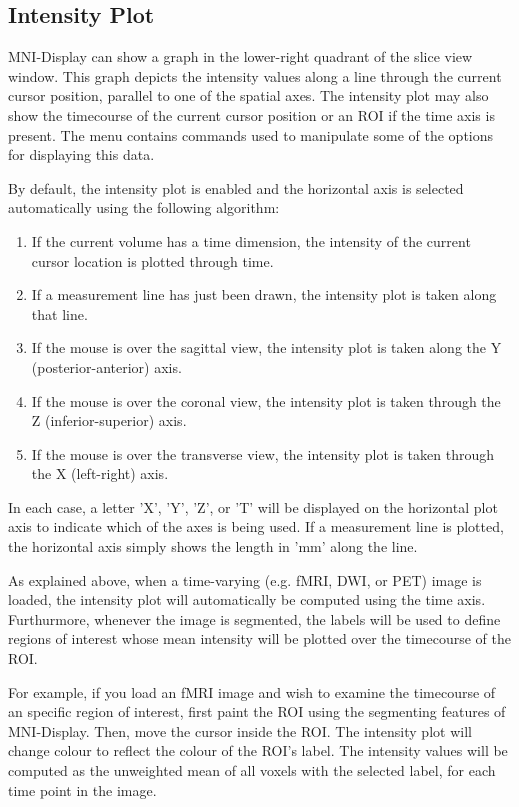 \documentclass[11pt,letterpaper]{article}
\newcommand{\display}{\mbox{MNI-Display}}
\newcommand{\menu}[1]{{\scriptsize \fbox{\bf #1}}}
\begin{document}
\subsection{Intensity Plot}
\label{secIntensity}

\display{} can show a graph in the lower-right quadrant of the slice
view window. This graph depicts the intensity values along a line
through the current cursor position, parallel to one of the spatial
axes. The intensity plot may also show the timecourse of the current
cursor position or an ROI if the time axis is present.  The
\menu{Intensity Plot} menu contains commands used to manipulate some
of the options for displaying this data.

By default, the intensity plot is enabled and the horizontal axis is
selected automatically using the following algorithm:

\begin{enumerate}
\item If the current volume has a time dimension, the intensity of the
  current cursor location is plotted through time.
\item If a measurement line has just been drawn, the intensity plot is taken along that line.
\item If the mouse is over the sagittal view, the intensity plot is taken along the Y (posterior-anterior) axis.
\item If the mouse is over the coronal view, the intensity plot is taken through the Z (inferior-superior) axis.
\item If the mouse is over the transverse view, the intensity plot is taken through the X (left-right) axis.
\end{enumerate}

In each case, a letter 'X', 'Y', 'Z', or 'T' will be displayed on the
horizontal plot axis to indicate which of the axes is being used. If a
measurement line is plotted, the horizontal axis simply shows the
length in 'mm' along the line.

As explained above, when a time-varying (e.g. fMRI, DWI, or PET) image
is loaded, the intensity plot will automatically be computed using the
time axis. Furthurmore, whenever the image is segmented, the labels
will be used to define regions of interest whose mean intensity will
be plotted over the timecourse of the ROI.

For example, if you load an fMRI image and wish to examine the
timecourse of an specific region of interest, first paint the ROI
using the segmenting features of \display{}. Then, move the cursor
inside the ROI. The intensity plot will change colour to reflect the
colour of the ROI's label. The intensity values will be computed as
the unweighted mean of all voxels with the selected label, for each
time point in the image.
\end{document}
